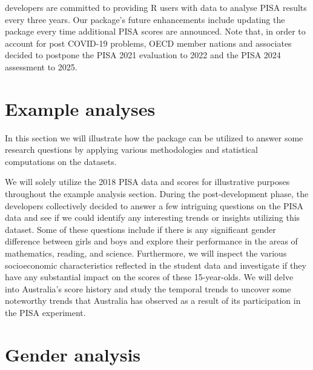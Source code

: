  developers are committed to providing R users with data to analyse PISA results every three years. Our package's future enhancements include updating the package every time additional PISA scores are announced. Note that, in order to account for post COVID-19 problems, OECD member nations and associates decided to postpone the PISA 2021 evaluation to 2022 and the PISA 2024 assessment to 2025.

\hypertarget{example-analyses}{%
\section{Example analyses}\label{example-analyses}}

In this section we will illustrate how the  package can be utilized to answer some research questions by applying various methodologies and statistical computations on the  datasets.

We will solely utilize the 2018 PISA data and scores for illustrative purposes throughout the example analysis section. During the post-development phase, the  developers collectively decided to answer a few intriguing questions on the PISA data and see if we could identify any interesting trends or insights utilizing this dataset. Some of these questions include if there is any significant gender difference between girls and boys and explore their performance in the areas of mathematics, reading, and science. Furthermore, we will inspect the various socioeconomic characteristics reflected in the student data and investigate if they have any substantial impact on the scores of these 15-year-olds. We will delve into Australia's score history and study the temporal trends to uncover some noteworthy trends that Australia has observed as a result of its participation in the PISA experiment.

\hypertarget{gender-analysis}{%
\section{Gender analysis}\label{gender-analysis}}

